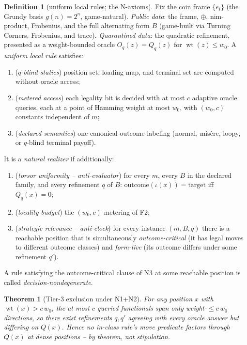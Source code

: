 \documentclass[11pt]{article}
\theoremstyle{plain}
\newtheorem{theorem}{Theorem}
\theoremstyle{definition}
\newtheorem{definition}{Definition}
\newcommand{\wt}{\operatorname{wt}}
\begin{document}
\begin{definition}[uniform local rules; the N-axioms]\label{def:criterion}
Fix the coin frame $\{e_i\}$ (the Grundy basis $g(n)=2^n$, game-natural).
\emph{Public data}: the frame, $\oplus$, nim-product, Frobenius, and the
full alternating form $B$ (game-built via Turning Corners, Frobenius, and
trace). \emph{Quarantined data}: the quadratic refinement, presented as a
weight-bounded oracle $O_q(z)=Q_q(z)$ for $\wt(z)\leq w_0$.
A \emph{uniform local rule} satisfies:
\begin{enumerate}[leftmargin=*,itemsep=0pt]
\item[\textbf{F1}] (\emph{$q$-blind statics}) position set, loading map,
and terminal set are computed without oracle access;
\item[\textbf{F2}] (\emph{metered access}) each legality bit is decided
with at most $c$ adaptive oracle queries, each at a point of Hamming weight
at most $w_0$, with $(w_0,c)$ constants independent of $m$;
\item[\textbf{F3}] (\emph{declared semantics}) one canonical outcome
labeling (normal, misère, loopy, or $q$-blind terminal payoff).
\end{enumerate}
It is a \emph{natural realizer} if additionally:
\begin{enumerate}[leftmargin=*,itemsep=0pt]
\item[\textbf{N1}] (\emph{torsor uniformity -- anti-evaluator}) for every
$m$, every $B$ in the declared family, and every refinement $q$ of $B$:
$\mathrm{outcome}(\iota(x))=\text{target}$ iff $Q_q(x)=0$;
\item[\textbf{N2}] (\emph{locality budget}) the $(w_0,c)$ metering of F2;
\item[\textbf{N3}] (\emph{strategic relevance -- anti-clock}) for every
instance $(m,B,q)$ there is a reachable position that is simultaneously
\emph{outcome-critical} (it has legal moves to different outcome classes)
and \emph{form-live} (its outcome differs under some refinement $q'$).
\end{enumerate}
A rule satisfying the outcome-critical clause of N3 at some reachable
position is called \emph{decision-nondegenerate}.
\end{definition}

\begin{theorem}[Tier-3 exclusion under N1+N2]\label{thm:tier3excl}
For any position $x$ with $\wt(x)>c\,w_0$, the at most $c$ queried
functionals span only weight-$\leq c\,w_0$ directions, so there exist
refinements $q,q'$ agreeing with every oracle answer but differing on
$Q(x)$. Hence no in-class rule's move predicate factors through $Q(x)$ at
dense positions -- by theorem, not stipulation.
\end{theorem}
\end{document}
